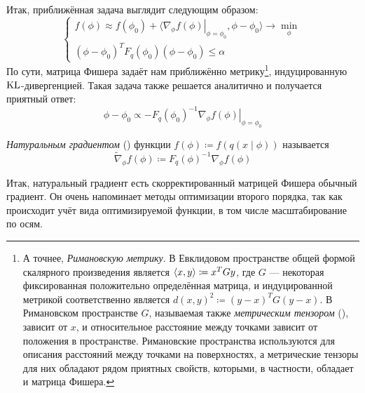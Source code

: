 Итак, приближённая задача выглядит следующим образом:
$$\begin{cases}
f(\phi) \approx f(\phi_0) + \langle \left. \nabla_\phi f(\phi) \right|_{\phi = \phi_0}, \phi - \phi_0 \rangle \to \min\limits_{\phi} \\
(\phi - \phi_0)^T F_q(\phi_0) (\phi - \phi_0) \le \alpha
\end{cases}$$
По сути, матрица Фишера задаёт нам приближённо метрику\footnote{А точнее, \emph{Римановскую метрику}. В Евклидовом пространстве общей формой скалярного произведения является $\langle x, y \rangle \HM\coloneqq x^TGy$, где $G$ --- некоторая фиксированная положительно определённая матрица, и индуцированной метрикой соответственно является $d(x, y)^2 \coloneqq  (y - x)^T G (y - x)$. В Римановском пространстве $G$, называемая также \emph{метрическим тензором} (), зависит от $x$, и относительное расстояние между точками зависит от положения в пространстве. Римановские пространства используются для описания расстояний между точками на поверхностях, а метрические тензоры для них обладают рядом приятных свойств, которыми, в частности, обладает и матрица Фишера.}, индуцированную $\operatorname{KL}$-дивергенцией. Такая задача также решается аналитично и получается приятный ответ:
\begin{equation}\label{naturalgradient}
\phi - \phi_0 \propto -F_q(\phi_0)^{-1} \left. \nabla_\phi f(\phi) \right|_{\phi = \phi_0}
\end{equation}

\begin{definition}
\emph{Натуральным градиентом} () функции $f(\phi) \coloneqq f(q(x \mid \phi))$ называется
$$\tilde{\nabla}_\phi f(\phi) \coloneqq F_q(\phi)^{-1} \nabla_\phi f(\phi)$$
\end{definition}

Итак, натуральный градиент есть скорректированный матрицей Фишера обычный градиент. Он очень напоминает методы оптимизации второго порядка, так как происходит учёт вида оптимизируемой функции, в том числе масштабирование по осям.

